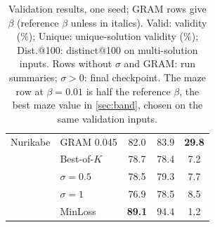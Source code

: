 \documentclass{article}
\newcommand{\Bok}{Best-of-$K$}
\begin{document}
\begin{table}[t]
\begin{tabular}{@{}llccc@{}}
Nurikabe & GRAM 0.045 & 82.0 & 83.9 & \textbf{29.8} \\
 & \Bok & 78.7 & 78.4 & 7.2 \\
 & \quad $\sigma=0.5$ & 78.5 & 79.3 & 7.7 \\
 & \quad $\sigma=1$ & 76.9 & 78.5 & 8.5 \\
 & MinLoss & \textbf{89.1} & 94.4 & 1.2 \\
\bottomrule
\end{tabular}
\caption{Validation results, one seed; GRAM rows give $\beta$ (reference $\beta$ unless in italics). Valid: validity
(\%); Unique: unique-solution validity (\%); Dist.@100: distinct@100 on multi-solution inputs. Rows without $\sigma$
and GRAM: run summaries; $\sigma>0$: final checkpoint. The maze row at $\beta=0.01$ is half the reference $\beta$,
the best maze value in \cref{sec:band}, chosen on the same validation inputs.}
\label{tab:main}
\end{table}
\end{document}
